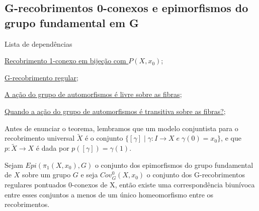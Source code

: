 \subsection{G-recobrimentos 0-conexos e epimorfismos do grupo fundamental em G}
\label{g-recobrimentos-e-epimorfismos-prop}
\begin{titlemize}{Lista de dependências}
    \item \hyperref[recobrimento-1-conexo-em-bijecao-com-P(X,x)]{Recobrimento 1-conexo em bijeção com $P(X, x_0)$};\\
	\item \hyperref[g-recobrimento-regular-def]{G-recobrimento regular};\\
    \item \hyperref[acao-de-automorfismos-e-livre-prop]{A ação do grupo de automorfismos é livre sobre as fibras};\\
    \item \hyperref[acao-de-automorfismo-transitiva-prop]{Quando a ação do grupo de automorfismos é transitiva sobre as fibras?};
\end{titlemize}

Antes de enunciar o teorema, lembramos que um modelo conjuntista para o recobrimento universal $\tilde X$ é o conjunto $\{[\gamma] \; | \; \gamma:I \longrightarrow X \; e \; \gamma (0) = x_0\}$, e que $p: \tilde X \longrightarrow X$ é dada por $p([\gamma]) = \gamma(1)$.

\begin{thm}
    Sejam $Epi(\pi_1(X, x_0), G)$ o conjunto dos epimorfismos do grupo fundamental de $X$ sobre um grupo $G$ e seja $Cov_G^0(X, x_0)$ o conjunto dos G-recobrimentos regulares pontuados 0-conexos de X, então existe uma correspondência biunívoca entre esses conjuntos a menos de um único homeomorfismo entre os recobrimentos.
\end{thm}

